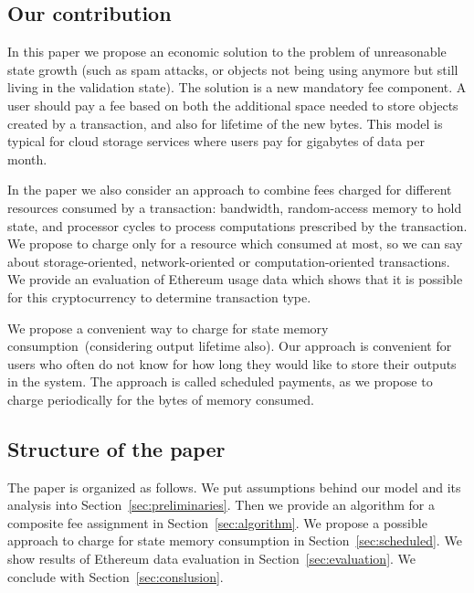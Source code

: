 \documentclass[]{llncs}   %
\begin{document}
\subsection{Our contribution}

In this paper we propose an economic solution to the problem of unreasonable state growth
(such as spam attacks, or objects not being using anymore but still living in
the validation state). The solution is a new mandatory fee component. A 
user should pay a fee based on both the additional space needed to store objects
created by a transaction, and also for lifetime of the new bytes. This model is
typical for cloud storage services where users pay for gigabytes of data per
month. 

In the paper we also consider an approach to combine fees charged for different resources consumed by a transaction:
bandwidth, random-access memory to hold state, and processor cycles to process computations prescribed by the transaction.    
We propose to charge only for a resource which consumed at most, so we can say about storage-oriented, network-oriented or computation-oriented transactions. We provide an evaluation of Ethereum usage data which shows that it is possible for this cryptocurrency to determine transaction type.

We propose a convenient way to charge for state memory consumption~(considering output lifetime also). Our approach is convenient for users who often do not know for how long they would like to store their outputs in the system. The approach is called scheduled payments, as we propose to charge periodically for the bytes of memory consumed.






\subsection{Structure of the paper}
The paper is organized as follows. We put assumptions behind our model and its analysis into Section~\ref{sec:preliminaries}. Then we provide an algorithm for a composite fee assignment in Section~\ref{sec:algorithm}. We propose a possible approach to charge for state memory consumption in Section~\ref{sec:scheduled}. We show results of Ethereum data evaluation in Section~\ref{sec:evaluation}. We conclude with Section~\ref{sec:conslusion}.
\end{document}
